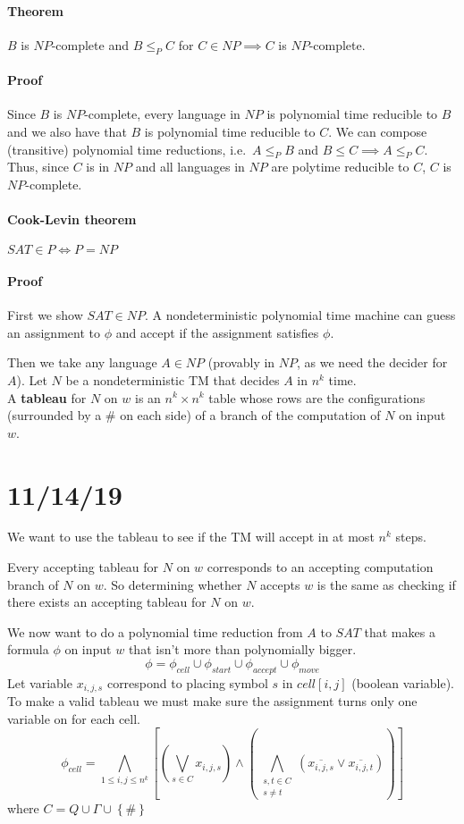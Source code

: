 \documentclass[12 pt]{article}
\begin{document}
\paragraph{Theorem} $B$ is $NP$-complete and $B \leq_P C$ for $C \in
NP \implies C$ is $NP$-complete.
\paragraph{Proof} Since $B$ is $NP$-complete, every language in $NP$
is polynomial time reducible to $B$ and we also have that $B$ is
polynomial time reducible to $C$. We can compose (transitive) polynomial time
reductions, i.e.\ $A \leq_P B$ and $B \leq C \implies A \leq_P
C$. Thus, since $C$ is in $NP$ and all languages in $NP$ are polytime
reducible to $C$, $C$ is $NP$-complete.
\paragraph{Cook-Levin theorem} $SAT \in P \iff P = NP$
\paragraph{Proof} First we show $SAT \in NP$. A nondeterministic
polynomial time machine can guess an assignment to $\phi$ and accept
if the assignment satisfies $\phi$.

Then we take any language $A \in NP$ (provably in $NP$, as we need the
decider for $A$). Let $N$ be a
nondeterministic TM that decides $A$ in $n^k$ time.
\\ A \textbf{tableau} for $N$ on $w$ is an $n^k \times n^k$ table
whose rows are the configurations (surrounded by a \# on each side) of a branch of the computation of
$N$ on input $w$.
\section{11/14/19}
We want to use the tableau to see if the TM will accept in at most $n^k$
steps.

Every accepting tableau for $N$ on $w$ corresponds to an accepting
computation branch of $N$ on $w$. So determining whether $N$ accepts
$w$ is the same as checking if there exists an accepting tableau for
$N$ on $w$.

We now want to do a polynomial time reduction from $A$ to $SAT$ that
makes a formula $\phi$ on input $w$ that isn't more than polynomially
bigger.
$$ \phi = \phi_{cell} \cup \phi_{start} \cup \phi_{accept} \cup
\phi_{move}$$
Let variable $x_{i,j,s}$ correspond to placing symbol $s$ in
$cell[i,j]$ (boolean variable). To make a valid tableau we must make
sure the assignment turns only one variable on for each cell.
$$\phi_{cell} = \bigwedge_{1 \leq i, j \leq n^k}
\left[\left(\bigvee_{s \in C} x_{i,j,s}\right) \land \left(\bigwedge_{\substack{s,t \in C \\ s \neq t}}
    (\overline{x_{i,j,s}} \lor \overline{x_{i,j,t}})\right)\right]$$
where $C = Q \cup \Gamma \cup \left\{\#\right\}$
\end{document}
